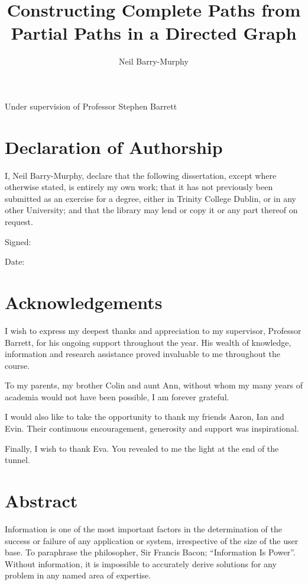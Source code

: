 \documentclass[12pt]{article}   	%
\title{Constructing Complete Paths from Partial Paths in a Directed Graph}
\author{Neil Barry-Murphy}
\affil{Trinity College Dublin}
\begin{document}
\maketitle

\hfill
\begin{figure}[htp]
\end{figure}

\hfill
\begin{center}
Under supervision of Professor Stephen Barrett
\end{center}
\thispagestyle{empty}

\newpage

\section*{Declaration of Authorship}
I, Neil Barry-Murphy, declare that the following dissertation, except where otherwise stated, is entirely my own work; that it has not previously been submitted as an exercise for a degree, either in Trinity College Dublin, or in any other University; and that the library may lend or copy it or any part thereof on request.

\noindent
Signed:

\noindent
Date:

\newpage

\section*{Acknowledgements}
I wish to express my deepest thanks and appreciation to my supervisor, Professor Barrett, for his ongoing support throughout the year. His wealth of knowledge, information and research assistance proved invaluable to me throughout the course.

\noindent
To my parents, my brother Colin and aunt Ann, without whom my many years of academia would not have been possible, I am forever grateful.

\noindent
I would also like to take the opportunity to thank my friends Aaron, Ian and Evin. Their continuous encouragement, generosity and support was inspirational.

\noindent
Finally, I wish to thank Eva. You revealed to me the light at the end of the tunnel.
\newpage

\section*{Abstract}
Information is one of the most important factors in the determination of the success or failure of any application or system, irrespective of the size of the user base. To paraphrase the philosopher, Sir Francis Bacon; “Information Is Power”. Without information, it is impossible to accurately derive solutions for any problem in any named area of expertise.
\end{document}
